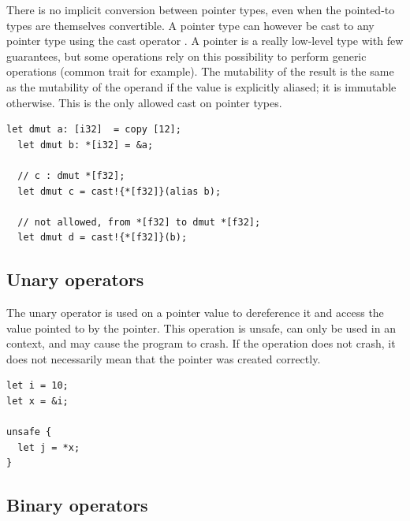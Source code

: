 There is no implicit conversion between pointer types, even when the pointed-to
types are themselves convertible. A pointer type can however be cast to any
pointer type using the cast operator . A pointer is a really low-level type with few guarantees,
but some operations rely on this possibility to perform generic operations
(common trait  for example). The mutability of the result is
the same as the mutability of the operand if the value is explicitly aliased; it is
immutable otherwise. This is the only allowed cast on pointer types.
\smallskip

\begin{lstlisting}[style=coloredverbatimError]
  let dmut a: [i32]  = copy [12];
  let dmut b: *[i32] = &a;

  // c : dmut *[f32];
  let dmut c = cast!{*[f32]}(alias b);

  // not allowed, from *[f32] to dmut *[f32];
  let dmut d = cast!{*[f32]}(b);
\end{lstlisting}

\subsection{Unary operators}

The unary operator \token{*} is used on a pointer value to dereference it and
access the value pointed to by the pointer. This operation is unsafe, can only
be used in an  context, and may cause the program to crash. If the
operation does not crash, it does not necessarily mean that the pointer was
created correctly.
\smallskip

\begin{lstlisting}[style=coloredverbatim]
let i = 10;
let x = &i;

unsafe {
  let j = *x;
}
\end{lstlisting}

\subsection{Binary operators}

